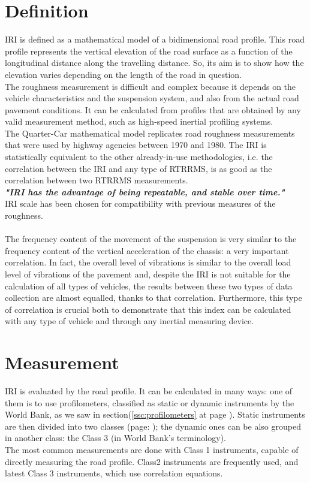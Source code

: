 \documentclass[tesi]{subfiles}
\begin{document}
\section{Definition}\label{sc:IRI Definition}
IRI is defined as a mathematical model of a bidimensional road profile. This road profile represents the vertical elevation of the road surface as a function of the longitudinal distance along the travelling distance\cite{wang2006road}. So, its aim is to show how the elevation varies depending on the length of the road in question.
\\The roughness measurement is difficult and complex because it depends on the vehicle characteristics and the suspension system, and also from the actual road pavement conditions. It can be calculated from profiles that are obtained by any valid measurement method, such as high-speed inertial profiling systems.\\
The Quarter-Car mathematical model replicates road roughness measurements that were used by highway agencies between 1970 and 1980. The IRI is statistically equivalent to the other already-in-use methodologies, i.e. the correlation between the IRI and any type of RTRRMS, is as good as the correlation between two RTRRMS measurements.
\\
\textbf{\textit{"IRI has the advantage of being repeatable, and stable over time."}}\\
IRI scale has been chosen for compatibility with previous measures of the roughness.\\\\
The frequency content of the movement of the suspension is very similar to the frequency content of the vertical acceleration of the chassis: a very important correlation. In fact, the overall level of vibrations is similar to the overall load level of vibrations of the pavement and, despite the IRI is not suitable for the calculation of all types of vehicles, the results between these two types of data collection are almost equalled, thanks to that correlation. Furthermore, this type of correlation is crucial both to demonstrate that this index can be calculated with any type of vehicle and through any inertial measuring device.

\section{Measurement}\label{Measurement of IRI}
IRI is evaluated by the road profile. It can be calculated in many ways: one of them is to use profilometers, classified as static or dynamic instruments by the World Bank, as we saw in section(\ref{ssc:profilometers} at page \pageref{ssc:profilometers}). Static instruments are then divided into two classes (page: \pageref{ssc:Instrument_Contact}); the dynamic ones can be also grouped in another class: the Class 3 (in World Bank's terminology).\\ The most common measurements are done with Class 1 instruments, capable of directly measuring the road profile. Class2 instruments are frequently used, and latest Class 3 instruments, which use correlation equations.
\end{document}
